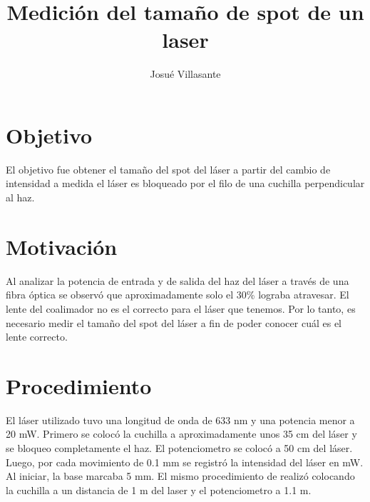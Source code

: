 \documentclass[twocolumn]{article}
\author{Josué Villasante}
\title{Medición del tamaño de spot de un laser}
\begin{document}
	\maketitle

	\section{Objetivo}
		El objetivo fue obtener el tamaño del spot del láser a partir del cambio de intensidad a medida el láser es bloqueado por el filo de una cuchilla perpendicular al haz.
	
	\section{Motivación}
		Al analizar la potencia de entrada y de salida del haz del láser a través de una fibra óptica se observó que aproximadamente solo el 30\% lograba atravesar. El lente del coalimador no es el correcto para el láser que tenemos. Por lo tanto, es necesario medir el tamaño del spot del láser a fin de poder conocer cuál es el lente correcto.
	
	\section{Procedimiento}
		El láser utilizado tuvo una longitud de onda de 633 nm y una potencia menor a 20 mW. Primero se colocó la cuchilla a aproximadamente unos 35 cm del láser y se bloqueo completamente el haz. El potenciometro se colocó a 50 cm del láser. Luego, por cada movimiento de 0.1 mm se registró la intensidad del láser en mW. Al iniciar, la base marcaba 5 mm.
		El mismo procedimiento de realizó colocando la cuchilla a un distancia de 1 m del laser y el potenciometro a 1.1 m.
\end{document}
